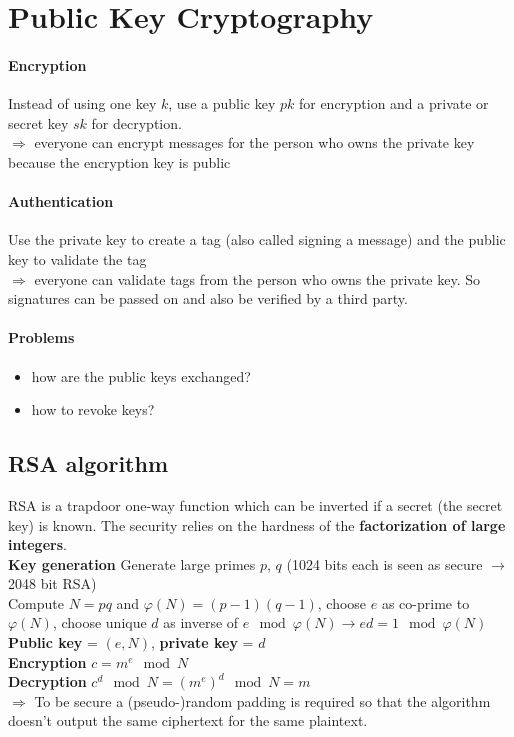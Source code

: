 \documentclass[12pt]{article}
\begin{document}
	\section{Public Key Cryptography}
	\paragraph{Encryption} Instead of using one key $k$, use a public key $pk$ for encryption and a private or secret key $sk$ for decryption.\\
	$\Rightarrow$ everyone can encrypt messages for the person who owns the private key because the encryption key is public
	\paragraph{Authentication} Use the private key to create a tag (also called signing a message) and the public key to validate the tag\\
	$\Rightarrow$ everyone can validate tags from the person who owns the private key. So signatures can be passed on and also be verified by a third party.
	\paragraph{Problems}
	\begin{itemize}
		\item how are the public keys exchanged?
		\item how to revoke keys?
	\end{itemize}
	
	\subsection{RSA algorithm}
	RSA is a trapdoor one-way function which can be inverted if a secret (the secret key) is known. The security relies on the hardness of the \textbf{factorization of large integers}.\\
	\textbf{Key generation} Generate large primes $p$, $q$ (1024 bits each is seen as secure $\rightarrow$ 2048 bit RSA)\\
	Compute $N=pq$ and $\varphi(N)=(p-1)(q-1)$, choose $e$ as co-prime to $\varphi(N)$, choose unique $d$ as inverse of $e \mod \varphi(N) \rightarrow ed = 1 \mod \varphi(N)$\\
	\textbf{Public key} = $(e,N)$, \textbf{private key} = $d$\\
	\textbf{Encryption} $c = m^e \mod N$\\
	\textbf{Decryption} $c^d \mod N = (m^e)^d \mod N = m$\\
	$\Rightarrow$ To be secure a (pseudo-)random padding is required so that the algorithm doesn't output the same ciphertext for the same plaintext.
	
\end{document}
